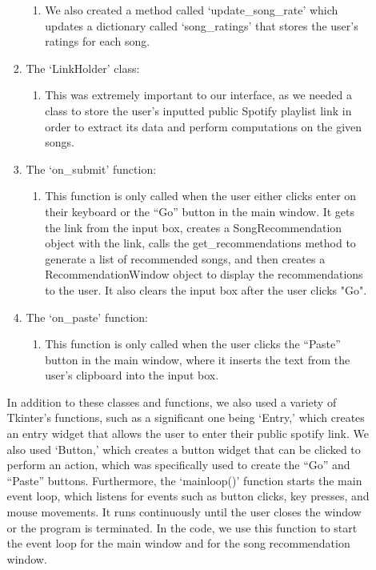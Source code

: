 \documentclass[fontsize=11pt]{article}
\begin{document}
\begin{enumerate}
\begin{enumerate}
\begin{enumerate}
\begin{enumerate}
                \item We also created a method called ‘update\_song\_rate’ which updates a dictionary called ‘song\_ratings’ that stores the user’s ratings for each song. \\
            \end{enumerate}

            \item {The ‘LinkHolder’ class:}
            \begin{enumerate}
                \item This was extremely important to our interface, as we needed a class to store the user’s inputted public Spotify playlist link in order to extract its data and perform computations on the given songs. \\
            \end{enumerate}

            \item {The $‘$on\_submit$’$ function:}
            \begin{enumerate}
                \item This function is only called when the user either clicks enter on their keyboard or the “Go” button in the main window. It gets the link from the input box, creates a SongRecommendation object with the link, calls the get\_recommendations method to generate a list of recommended songs, and then creates a RecommendationWindow object to display the recommendations to the user. It also clears the input box after the user clicks "Go". \\
            \end{enumerate}
            
            \item {The $‘$on\_paste$’$ function:}
            \begin{enumerate}
                \item This function is only called when the user clicks the “Paste” button in the main window, where it inserts the text from the user’s clipboard into the input box. \\
            \end{enumerate}
        \end{enumerate}
        
        In addition to these classes and functions, we also used a variety of Tkinter’s functions, such as a significant one being ‘Entry,’ which creates an entry widget that allows the user to enter their public spotify link. We also used ‘Button,’ which creates a button widget that can be clicked to perform an action, which was specifically used to create the “Go” and “Paste” buttons. Furthermore, the ‘mainloop()’ function starts the main event loop, which listens for events such as button clicks, key presses, and mouse movements. It runs continuously until the user closes the window or the program is terminated. In the code, we use this function to start the event loop for the main window and for the song recommendation window. \\


\end{enumerate}
\end{enumerate}
\end{document}

